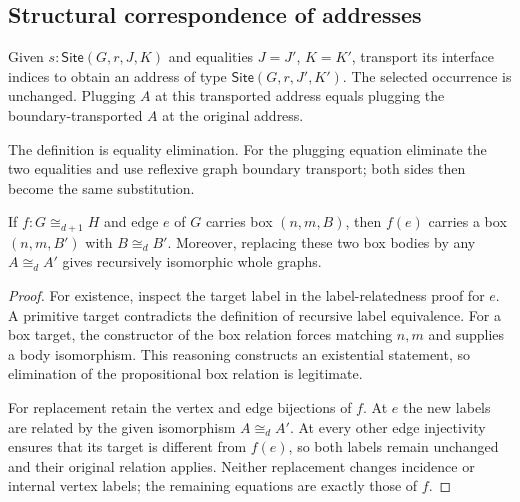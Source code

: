 \subsection{Structural correspondence of addresses}

\begin{definition}\label{term:site-interface-transport}
Given $s:\mathsf{Site}(G,r,J,K)$ and equalities $J=J'$, $K=K'$, transport its
interface indices to obtain an address of type $\mathsf{Site}(G,r,J',K')$.
The selected occurrence is unchanged. Plugging $A$ at this transported address
equals plugging the boundary-transported $A$ at the original address.
\end{definition}
The definition is equality elimination. For the plugging equation eliminate
the two equalities and use reflexive graph boundary transport; both sides then
become the same substitution.

\begin{lemma}
If $f:G\cong_{d+1}H$ and edge $e$ of $G$ carries box $(n,m,B)$, then $f(e)$
carries a box $(n,m,B')$ with $B\cong_d B'$. Moreover, replacing these two box
bodies by any $A\cong_d A'$ gives recursively isomorphic whole graphs.
\end{lemma}
\begin{proof}
For existence, inspect the target label in the label-relatedness proof for
$e$. A primitive target contradicts the definition of recursive label
equivalence. For a box target, the constructor of the box relation forces
matching $n,m$ and supplies a body isomorphism. This reasoning constructs an
existential statement, so elimination of the propositional box relation is
legitimate.

For replacement retain the vertex and edge bijections of $f$. At $e$ the new
labels are related by the given isomorphism $A\cong_d A'$. At every other edge
injectivity ensures that its target is different from $f(e)$, so both labels
remain unchanged and their original relation applies. Neither replacement
changes incidence or internal vertex labels; the remaining equations are
exactly those of $f$.
\end{proof}

